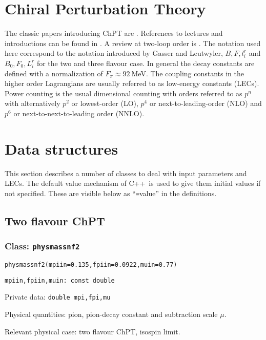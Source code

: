 \documentclass[12pt,a4paper]{article}
\newcommand{\mytt}[1]{\texttt{#1}}
\newcommand{\newfunction}[1]{\mytt{#1}\index{\mytt{#1}}}
\newcommand{\cpp}{\textsc{C++}}
\begin{document}
\section{Chiral Perturbation Theory}

The classic papers introducing ChPT are
\cite{Weinberg:1978kz,Gasser:1983yg,Gasser:1984gg}.
References to lectures and introductions can be found in \cite{webpage}.
A review at two-loop order is \cite{Bijnens:2006zp}.
The notation used here correspond to the notation introduced by Gasser
and Leutwyler, $B,F,l_i^r$ \cite{Gasser:1983yg} and
$B_0,F_0,L_i^r$ \cite{Gasser:1984gg} for the two and three flavour case.
In general the decay constants are defined with a normalization of
$F_\pi\approx 92~$MeV. The coupling constants in the higher order Lagrangians
are usually referred to as low-energy constants (LECs). Power counting
is the usual dimensional counting with orders referred to as $p^n$
with alternatively $p^2$ or lowest-order (LO), $p^4$ or next-to-leading-order
(NLO) and $p^6$ or next-to-next-to-leading order (NNLO).

\section{Data structures}

This section describes a number of classes to deal with input parameters
and LECs. The default value mechanism of \cpp\ is used to give them
initial values if not specified. These are visible below as ``\mytt=value''
in the definitions.
\subsection{Two flavour ChPT}

\subsubsection{Class: \newfunction{physmassnf2}}

\mytt{physmassnf2(mpiin=0.135,fpiin=0.0922,muin=0.77)}

\mytt{mpiin,fpiin,muin: const double}

Private data: \mytt{double mpi,fpi,mu}

Physical quantities: pion, pion-decay constant and
subtraction scale $\mu$.

Relevant physical case: two flavour ChPT, isospin limit.\\
\end{document}
